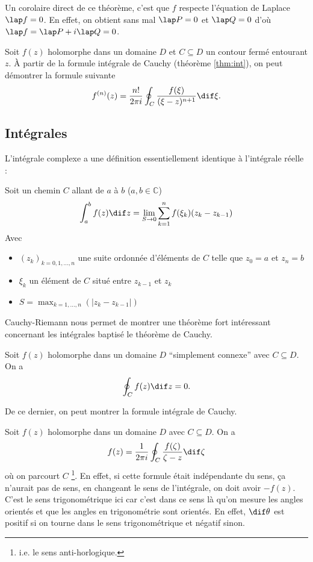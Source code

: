 Un corolaire direct de ce théorème, c'est que $f$ respecte l'équation
de Laplace $\lap f = 0$.
En effet, on obtient sans mal $\lap P = 0$ et $\lap Q = 0$ d'où
$\lap f = \lap P + i\lap Q = 0$.

\begin{mytheo}
	Soit $f(z)$ holomorphe dans un domaine $D$
    et $C \subseteq D$ un contour fermé entourant $z$.
    À partir de la formule intégrale
	de Cauchy (théorème \ref{thm:int}),
	on peut démontrer la formule suivante
	\[ f^{(n)}(z) = \frac{n!}{2\pi i}\oint_C
	\frac{f(\xi)}{(\xi-z)^{n+1}}\dif \xi.\]
\end{mytheo}

\subsection{Intégrales}
L'intégrale complexe a une définition essentiellement identique à
l'intégrale réelle :

\begin{mydef}
    Soit un chemin $C$ allant de $a$ à $b$ ($a, b \in \mathbb{C}$)
    \[\int_a^b f(z) \dif z =
    \lim_{S \to 0} \sum_{k=1}^{n} f(\xi_k)(z_k - z_{k-1})\]
    Avec
    \begin{itemize}
        \item $(z_k)_{k = 0, 1, ..., n}$ une suite ordonnée d'éléments
            de $C$ telle que $z_0 = a$ et $z_n = b$
        \item $\xi_k$ un élément de $C$ situé entre $z_{k-1}$ et $z_k$
        \item $S = \max_{k = 1, ..., n}(|z_k - z_{k-1}|)$
    \end{itemize}
\end{mydef}


Cauchy-Riemann nous permet de montrer
une théorème fort intéressant concernant les intégrales baptisé le
théorème de Cauchy.
\begin{mytheo}
  Soit $f(z)$ holomorphe dans un domaine $D$ ``simplement connexe''
  avec $C \subseteq D$.
  On a
  \[ \oint_C f(z) \dif z = 0. \]
\end{mytheo}
De ce dernier, on peut montrer la formule intégrale de Cauchy.
\begin{mytheo}
  \label{thm:int}
  Soit $f(z)$ holomorphe dans un domaine $D$
  avec $C \subseteq D$. %
  On a
  \[ f(z) = \frac{1}{2\pi i}\oint_C
  \frac{f(\zeta)}{\zeta-z} \dif \zeta \]
  où on parcourt $C$ 
  \footnote{i.e. le sens anti-horlogique.}.
  En effet, si cette formule était indépendante du sens,
  ça n'aurait pas de sens,
  en changeant le sens de l'intégrale,
  on doit avoir $-f(z)$.
  C'est le sens trigonométrique ici car c'est dans ce sens
  là qu'on mesure les angles orientés et que les angles en trigonométrie
  sont orientés.
  En effet, $\dif \theta$ est positif si on tourne dans le sens
  trigonométrique et négatif sinon.
\end{mytheo}

